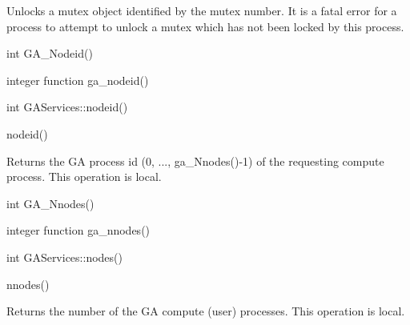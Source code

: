 \documentclass[12pt]{article}
\begin{document}
\begin{desc}

Unlocks a mutex object identified by the mutex number. It is a fatal 
error for a process to attempt to unlock a mutex which has not been 
locked by this process.
\end{desc}


\begin{capi}
int GA_Nodeid()
\end{capi}

\begin{fapi}
integer function ga_nodeid()
\end{fapi}

\begin{cxxapi}
int GAServices::nodeid()
\end{cxxapi}

\begin{pyapi}
nodeid() 
\end{pyapi} 


\begin{desc}

Returns the GA process id (0, ..., ga_Nnodes()-1) of the requesting compute process.
This operation is local.
\end{desc}


\begin{capi}
int GA_Nnodes()
\end{capi}

\begin{fapi}
integer function ga_nnodes()
\end{fapi}

\begin{cxxapi}
int GAServices::nodes()
\end{cxxapi}

\begin{pyapi}
nnodes() 
\end{pyapi} 


\begin{desc}

Returns the number of the GA compute (user) processes.
This operation is local.
\end{desc}

\end{document}
